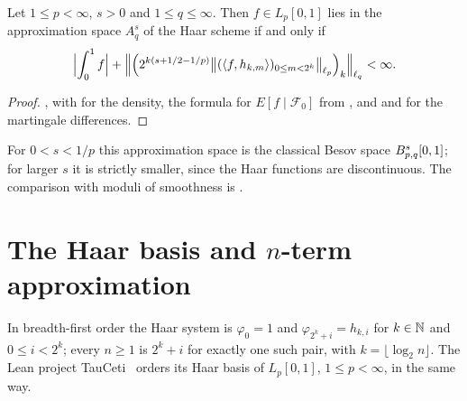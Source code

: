 \begin{theorem}
\label{thm:haar}
\leanok
{}
Let $1 \leq p < \infty$, $s > 0$ and $1 \leq q \leq \infty$. Then $f \in L_p[0, 1]$ lies in the
approximation space $A^s_q$ of the Haar scheme if and only if
\[
  \Bigl| \int_0^1 f \Bigr| + \Bigl\| \Bigl(2^{k(s + 1/2 - 1/p)}
  \bigl\| (\langle f, h_{k,m} \rangle)_{0 \leq m < 2^k} \bigr\|_{\ell_p} \Bigr)_k
  \Bigr\|_{\ell_q} < \infty .
\]
\end{theorem}

\begin{proof}
\leanok
{}, with  for the density, the formula for
$E[f \mid \mathcal{F}_0]$ from , and
 and  for the martingale differences.
\end{proof}

For $0 < s < 1/p$ this approximation space is the classical Besov space
$B^{s}_{p,q}[0, 1]$; for larger $s$ it is strictly smaller, since the Haar functions are
discontinuous. The comparison with moduli of smoothness is .

\section{The Haar basis and \texorpdfstring{$n$}{n}-term approximation}
\label{sec:haar-nterm}

In breadth-first order the Haar system is $\varphi_0 = 1$ and $\varphi_{2^k + i} = h_{k,i}$ for
$k \in \mathbb{N}$ and $0 \leq i < 2^k$; every $n \geq 1$ is $2^k + i$ for exactly one such pair, with
$k = \lfloor \log_2 n \rfloor$. The Lean project TauCeti~\cite{TauCeti} orders its Haar basis of
$L_p[0, 1]$, $1 \leq p < \infty$, in the same way.

